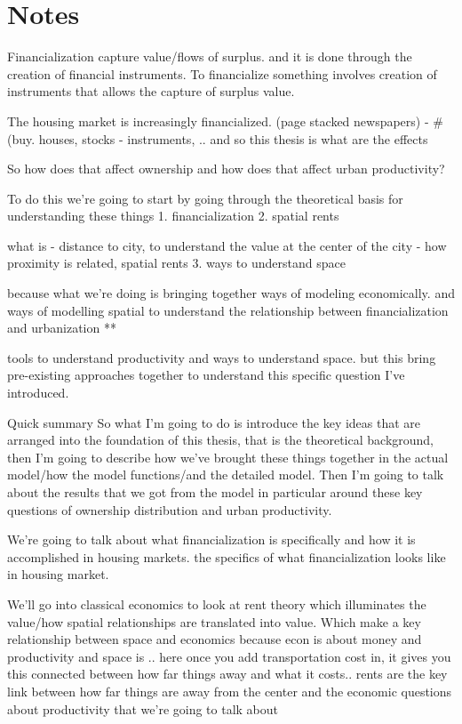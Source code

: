 \section{Notes}
Financialization capture value/flows of surplus. and it is done through the creation of financial instruments. To financialize something involves creation of instruments that allows the capture of surplus value. 


The housing market is increasingly financialized. (page stacked newspapers) - #(buy. houses, stocks -  instruments, ..
 and so this thesis is what are the effects

So how does that affect ownership and how does that affect urban productivity?

To do this we’re going to start by going through the theoretical basis for understanding these things
1. financialization
2. spatial rents


what is - distance to city, to understand the value at the center of the city - how proximity is related, spatial rents
3. ways to understand space

because what we’re doing is bringing together ways of modeling economically. and ways of modelling spatial to understand the relationship between financialization and urbanization **

tools to understand productivity and ways to understand space. but this bring pre-existing approaches together to understand this specific question I've introduced. 

Quick summary
So what I'm going to do 
is introduce the key  ideas that are arranged into the foundation of this thesis, that is the theoretical background, then I'm going to describe how we've brought these things together in the actual model/how the model functions/and the detailed model. Then I'm going to talk about the results that we got from the model in particular around these key questions of ownership distribution and urban productivity.

We're going to talk about what financialization is  specifically  and how it is accomplished in housing markets. the specifics of what financialization looks like in housing market.

We'll go into classical economics to look at rent theory which illuminates the value/how spatial relationships are translated into value. Which make a key relationship between space and economics because econ is about money and productivity and space is .. here once you add transportation cost in, it gives you this connected between how far things away and what it costs.. rents are the key link between how far things are away from the center and the economic questions about productivity  that we're going to talk about

